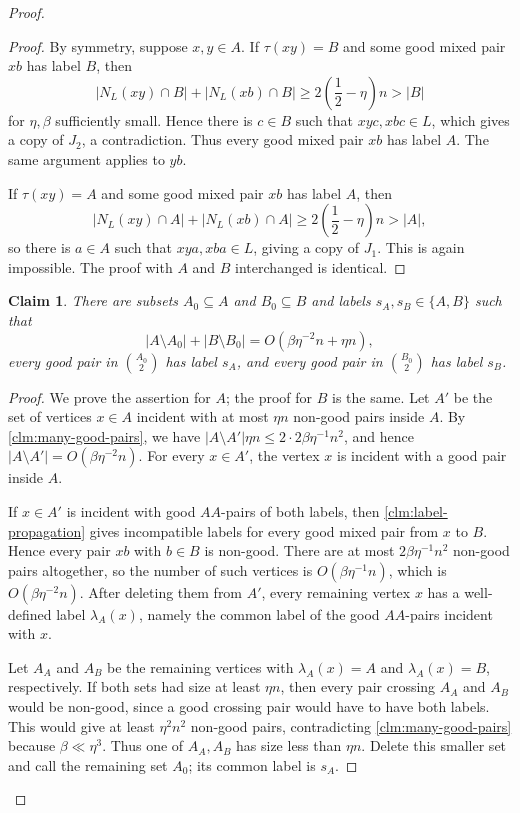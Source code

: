 \documentclass[10pt,a4paper]{article}
\theoremstyle{plain}
\newtheorem{claim}[claim]{Claim}
\theoremstyle{definition}
\begin{document}
\begin{proof}
\begin{proof}
By symmetry, suppose $x,y\in A$.  If $\tau(xy)=B$ and some good mixed pair $xb$ has label $B$, then
\[
|N_L(xy)\cap B|+|N_L(xb)\cap B|
\ge 2\left(\frac{1}{2}-\eta\right)n>|B|
\]
for $\eta,\beta$ sufficiently small.  Hence there is $c\in B$ such that $xyc,xbc\in L$, which gives a copy of $J_2$, a contradiction.  Thus every good mixed pair $xb$ has label $A$.  The same argument applies to $yb$.

If $\tau(xy)=A$ and some good mixed pair $xb$ has label $A$, then
\[
|N_L(xy)\cap A|+|N_L(xb)\cap A|
\ge 2\left(\frac{1}{2}-\eta\right)n>|A|,
\]
so there is $a\in A$ such that $xya,xba\in L$, giving a copy of $J_1$.  This is again impossible.  The proof with $A$ and $B$ interchanged is identical.
\end{proof}

\begin{claim}\label{clm:same-color-common-label}
There are subsets $A_0\subseteq A$ and $B_0\subseteq B$ and labels $s_A,s_B\in\{A,B\}$ such that
\[
|A\setminus A_0|+|B\setminus B_0|=O(\beta\eta^{-2}n+\eta n),
\]
every good pair in $\binom{A_0}{2}$ has label $s_A$, and every good pair in $\binom{B_0}{2}$ has label $s_B$.
\end{claim}

\begin{proof}
We prove the assertion for $A$; the proof for $B$ is the same.  Let $A'$ be the set of vertices $x\in A$ incident with at most $\eta n$ non-good pairs inside $A$.  By \cref{clm:many-good-pairs}, we have $|A\setminus A'|\eta n\le 2\cdot 2\beta\eta^{-1}n^2$, and hence $|A\setminus A'|=O(\beta\eta^{-2}n)$.
For every $x\in A'$, the vertex $x$ is incident with a good pair inside $A$.

If $x\in A'$ is incident with good $AA$-pairs of both labels, then \cref{clm:label-propagation} gives incompatible labels for every good mixed pair from $x$ to $B$.  Hence every pair $xb$ with $b\in B$ is non-good.  There are at most $2\beta\eta^{-1}n^2$ non-good pairs altogether, so the number of such vertices is $O(\beta\eta^{-1}n)$, which is $O(\beta\eta^{-2}n)$.  After deleting them from $A'$, every remaining vertex $x$ has a well-defined label $\lambda_A(x)$, namely the common label of the good $AA$-pairs incident with $x$.

Let $A_A$ and $A_B$ be the remaining vertices with $\lambda_A(x)=A$ and $\lambda_A(x)=B$, respectively.  If both sets had size at least $\eta n$, then every pair crossing $A_A$ and $A_B$ would be non-good, since a good crossing pair would have to have both labels.  This would give at least $\eta^2n^2$ non-good pairs, contradicting \cref{clm:many-good-pairs} because $\beta\ll\eta^3$.  Thus one of $A_A,A_B$ has size less than $\eta n$.  Delete this smaller set and call the remaining set $A_0$; its common label is $s_A$.
\end{proof}


\end{proof}
\end{document}
